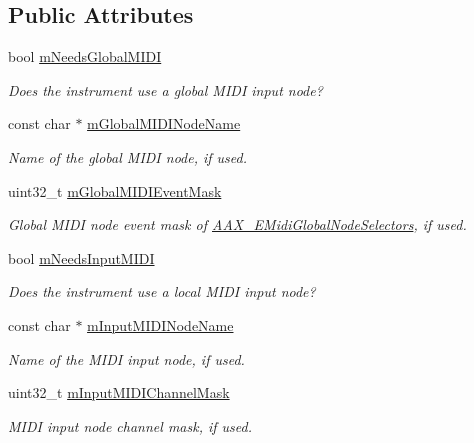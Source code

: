 \subsection*{Public Attributes}
\begin{DoxyCompactItemize}
\item 
bool \hyperlink{a00124_ae2d6f984fa92233e27828994a1e7ef79}{m\+Needs\+Global\+M\+I\+D\+I}
\begin{DoxyCompactList}\small\item\em Does the instrument use a global M\+I\+D\+I input node? \end{DoxyCompactList}\item 
const char $\ast$ \hyperlink{a00124_ae281e987dc73d0ff5d6ccbceb3383da9}{m\+Global\+M\+I\+D\+I\+Node\+Name}
\begin{DoxyCompactList}\small\item\em Name of the global M\+I\+D\+I node, if used. \end{DoxyCompactList}\item 
uint32\+\_\+t \hyperlink{a00124_a3b64c64e7b90cb189eb24e5417d9d88b}{m\+Global\+M\+I\+D\+I\+Event\+Mask}
\begin{DoxyCompactList}\small\item\em Global M\+I\+D\+I node event mask of \hyperlink{a00206_a349dae6bc64bda67a5440cbc6637f92d}{A\+A\+X\+\_\+\+E\+Midi\+Global\+Node\+Selectors}, if used. \end{DoxyCompactList}\item 
bool \hyperlink{a00124_a69f737db7dfa0c8362a0b368dc3e19e9}{m\+Needs\+Input\+M\+I\+D\+I}
\begin{DoxyCompactList}\small\item\em Does the instrument use a local M\+I\+D\+I input node? \end{DoxyCompactList}\item 
const char $\ast$ \hyperlink{a00124_ac9206c672bf45367ae0987b6adafb736}{m\+Input\+M\+I\+D\+I\+Node\+Name}
\begin{DoxyCompactList}\small\item\em Name of the M\+I\+D\+I input node, if used. \end{DoxyCompactList}\item 
uint32\+\_\+t \hyperlink{a00124_acfc35506cfa94a358411aade13070109}{m\+Input\+M\+I\+D\+I\+Channel\+Mask}
\begin{DoxyCompactList}\small\item\em M\+I\+D\+I input node channel mask, if used. \end{DoxyCompactList}\item 

\end{DoxyCompactItemize}
